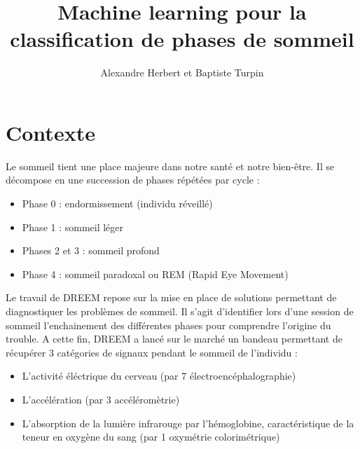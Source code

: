 \documentclass{article}
\title{Machine learning pour la classification de phases de sommeil}
\author{Alexandre Herbert et Baptiste Turpin}
\date{}
\begin{document}
\maketitle

\newpage

\setcounter{tocdepth}{2}
\renewcommand{\contentsname}{Sommaire}
\tableofcontents


\section{Contexte}

Le sommeil tient une place majeure dans notre santé et notre bien-être. Il se décompose en une succession de phases répétées par cycle :
\\
\begin{itemize}
\item Phase 0 : endormissement (individu réveillé)
\item Phase 1 : sommeil léger
\item Phases 2 et 3 : sommeil profond
\item Phase 4 : sommeil paradoxal ou REM (Rapid Eye Movement)
\end{itemize}
\vspace{0.5cm}

Le travail de DREEM repose sur la mise en place de solutions permettant de diagnostiquer les problèmes de sommeil. Il s'agit d'identifier lors d'une session de sommeil l'enchainement des différentes phases pour comprendre l'origine du trouble. A cette fin, DREEM a lancé sur le marché un bandeau permettant de récupérer 3 catégories de signaux pendant le sommeil de l'individu :
\\
\begin{itemize}
\item L'activité éléctrique du cerveau (par 7 électroencéphalographie)
\item L'accélération (par 3 accéléromètrie)
\item L'absorption de la lumière infrarouge par l'hémoglobine, caractéristique de la teneur en oxygène du sang (par 1 oxymétrie colorimétrique)
\end{itemize}
\vspace{0.5cm}
\end{document}
